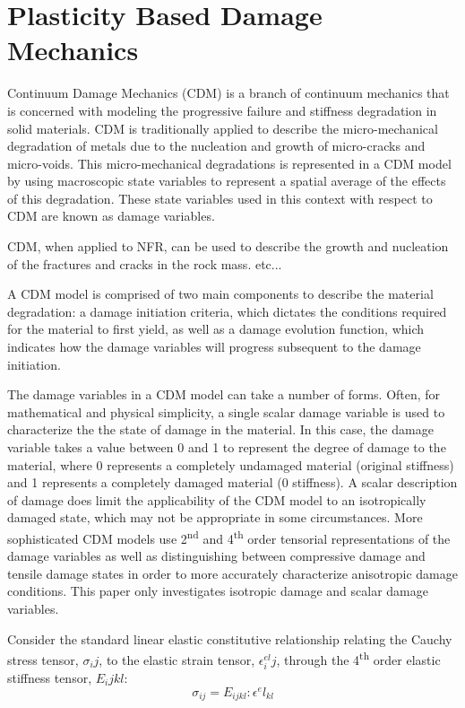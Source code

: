 \section{Plasticity Based Damage Mechanics}

Continuum Damage Mechanics (CDM) is a branch of continuum mechanics that is concerned with modeling the progressive failure and stiffness degradation in solid materials. CDM is traditionally applied to describe the micro-mechanical degradation of metals due to the nucleation and growth of micro-cracks and micro-voids. This micro-mechanical degradations is represented in a CDM model by using macroscopic state variables to represent a spatial average of the effects of this degradation. These state variables used in this context with respect to CDM are known as damage variables. 

CDM, when applied to NFR, can be used to describe the growth and nucleation of the fractures and cracks in the rock mass. etc...

A CDM model is comprised of two main components to describe the material degradation: a damage initiation criteria, which dictates the conditions required for the material to first yield, as well as a damage evolution function, which indicates how the damage variables will progress subsequent to the damage initiation. 

The damage variables in a CDM model can take a number of forms. Often, for mathematical and physical simplicity, a single scalar damage variable is used to characterize the the state of damage in the material. In this case, the damage variable takes a value between 0 and 1 to represent the degree of damage to the material, where 0 represents a completely undamaged material (original stiffness) and 1 represents a completely damaged material (0 stiffness). A scalar description of damage does limit the applicability of the CDM model to an isotropically damaged state, which may not be appropriate in some circumstances. More sophisticated CDM models use 2\textsuperscript{nd} and 4\textsuperscript{th} order tensorial representations of the damage variables as well as distinguishing between compressive damage and tensile damage states in order to more accurately characterize anisotropic damage conditions. This paper only investigates isotropic damage and scalar damage variables. 

Consider the standard linear elastic constitutive relationship relating the Cauchy stress tensor, $\sigma_ij$, to the elastic strain tensor, $\epsilon^{el}_ij$, through the 4\textsuperscript{th} order elastic stiffness tensor, $E_ijkl$:
\begin{equation}
\sigma_{ij} =E_{ijkl}:\epsilon^el_{kl}
\label{eqn:const3a}
\end{equation}

